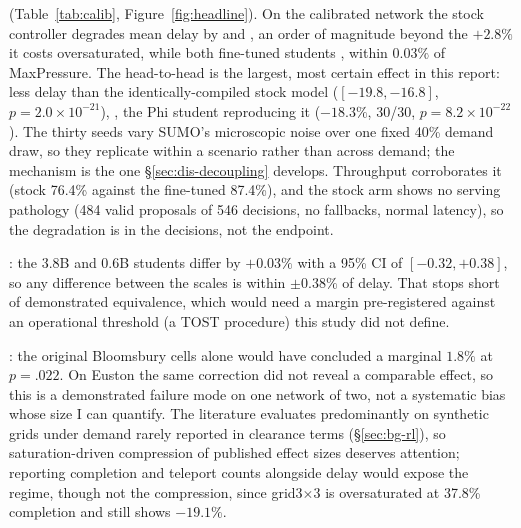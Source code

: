 

(Table~\ref{tab:calib}, Figure~\ref{fig:headline}). On the
calibrated network the stock controller degrades mean delay by
 and , an order of magnitude beyond the $+2.8\%$ it costs
oversaturated, while both fine-tuned students , within $0.03\%$ of MaxPressure. The head-to-head is the
largest, most certain effect in this report:  less delay
than the identically-compiled stock model ($[-19.8, -16.8]$,
$p{=}2.0{\times}10^{-21}$), , the Phi
student reproducing it ($-18.3\%$, 30/30, $p{=}8.2{\times}10^{-22}$). The
thirty seeds vary SUMO's microscopic noise over one fixed 40\% demand
draw, so they replicate within a scenario rather than across demand; the
mechanism is the one \S\ref{sec:dis-decoupling} develops. Throughput
corroborates it (stock 76.4\% against the fine-tuned 87.4\%), and the
stock arm shows no serving pathology (484 valid proposals of 546
decisions, no fallbacks, normal latency), so the degradation is in the
decisions, not the endpoint.

: the 3.8B and 0.6B students differ by $+0.03\%$ with a
95\% CI of $[-0.32, +0.38]$, so any difference between the scales is
within $\pm0.38\%$ of delay. That stops short of demonstrated equivalence,
which would need a margin pre-registered against an operational threshold
(a TOST procedure) this study did not define.

: the
original Bloomsbury cells alone would have concluded a marginal $1.8\%$ at
$p{=}.022$. On Euston the same correction did not reveal a comparable
effect, so this is a demonstrated failure mode on one network of two, not
a systematic bias whose size I can quantify. The literature evaluates
predominantly on synthetic grids under demand rarely reported in clearance
terms (\S\ref{sec:bg-rl}), so saturation-driven compression of published
effect sizes deserves attention; reporting completion and teleport counts
alongside delay would expose the regime, though not the compression, since
grid3$\times$3 is oversaturated at 37.8\% completion and still shows
$-19.1\%$.
